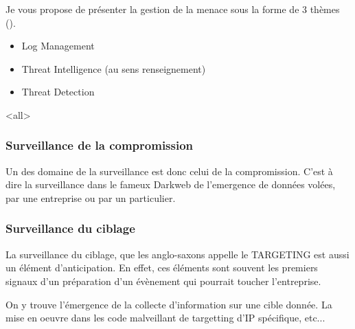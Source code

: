 Je vous propose de présenter  la gestion de la menace sous la forme de 3 thèmes  ().

\begin{itemize}
  \item Log Management
  \item Threat Intelligence (au sens renseignement)
  \item Threat Detection
\end{itemize}



\mode<all>{}






\subsubsection{Surveillance de la compromission}

Un des domaine de la surveillance est donc celui de la compromission. C'est à dire la surveillance dans le fameux Darkweb de l'emergence de données volées,  par une entreprise ou par un particulier.



\subsubsection{Surveillance du ciblage}


La surveillance du ciblage, que les anglo-saxons appelle le TARGETING est aussi un élément d'anticipation. 
En effet, ces éléments sont souvent les premiers signaux d'un préparation d'un évènement  qui pourrait toucher l'entreprise.

On y trouve l'émergence de la collecte d'information sur une cible donnée. La mise en oeuvre dans les code malveillant de targetting d'IP spécifique, etc...

